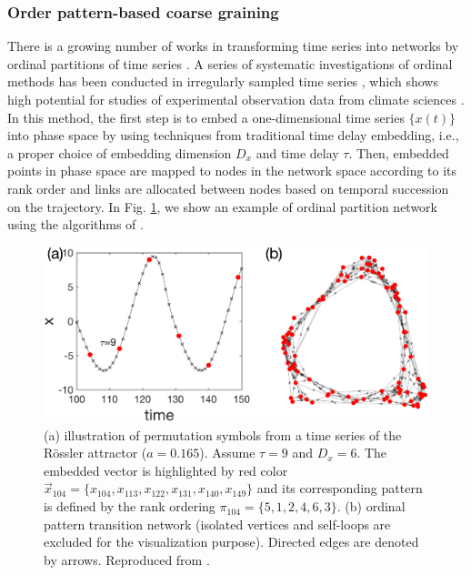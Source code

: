 		\subsubsection{Order pattern-based coarse graining}
		There is a growing number of works in transforming time series into networks by ordinal partitions of time series \cite{Small2013,McCullough2015,Kulp2016b,McCullough2017b,Small2018}.  A series of systematic investigations of ordinal methods has been conducted in irregularly sampled time series \cite{Kulp2016a,McCullough2016,Sakellariou2016}, which shows high potential for studies of experimental observation data from climate sciences \cite{Eroglu2016}. In this method, the first step is to embed a one-dimensional time series $\{x(t)\}$ into phase space by using techniques from traditional time delay embedding, i.e., a proper choice of embedding dimension $D_x$ and time delay $\tau$. Then, embedded points in phase space are mapped to nodes in the network space according to its rank order and links are allocated between nodes based on temporal succession on the trajectory. In Fig. \ref{fig:rosTNm}, we show an example of ordinal partition network using the algorithms of \cite{McCullough2015}. 
\begin{figure}[ht]
	\centering
	\includegraphics[width=\columnwidth]{Chapter05_TransitionNt/rosslerOPexample.eps}
\caption{(a) illustration of permutation symbols from a time series of the R\"ossler attractor ($a = 0.165$). Assume $\tau = 9$ and $D_x= 6$. The embedded vector is highlighted by red color $\vec{x}_{104} = \{x_{104}, x_{113}, x_{122}, x_{131}, x_{140}, x_{149} \}$ and its corresponding pattern is defined by the rank ordering $\pi_{104} = \{5, 1, 2, 4, 6, 3\}$. (b) ordinal pattern transition network (isolated vertices and self-loops are excluded for the visualization purpose). Directed edges are denoted by arrows. Reproduced from \cite{McCullough2015}. \label{fig:rosTNm}}
\end{figure}
		
